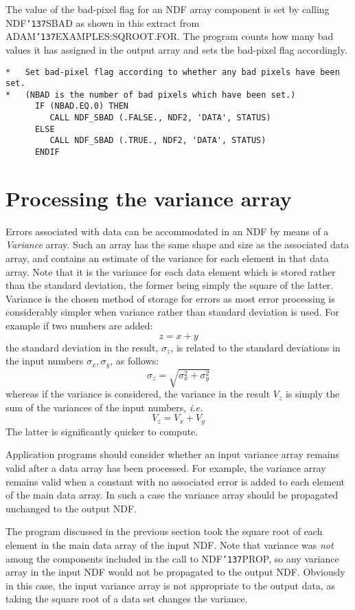 \documentclass[twoside,11pt]{article}
\renewcommand{\_}{{\tt\char'137}}
\newcommand{\xlabel}[1]{}
\begin{document}
The value of the bad-pixel flag for an NDF array component 
is set by calling NDF\_SBAD as shown in this extract 
from ADAM\_EXAMPLES:SQROOT.FOR.  The program  counts how many bad values 
it has assigned in the output array and sets the bad-pixel flag accordingly.
\begin{verbatim}
*   Set bad-pixel flag according to whether any bad pixels have been set.
*   (NBAD is the number of bad pixels which have been set.)
      IF (NBAD.EQ.0) THEN
         CALL NDF_SBAD (.FALSE., NDF2, 'DATA', STATUS)
      ELSE
         CALL NDF_SBAD (.TRUE., NDF2, 'DATA', STATUS)
      ENDIF
\end{verbatim}

\newpage
\section{Processing the variance array\label{variance}\xlabel{processing_the_variance_array}}

Errors associated with data can be accommodated in an NDF by means of a
{\sl Variance\/} array.
Such an array has the same shape and size
as the associated data array, and contains an estimate of the variance 
for each element in that data array.
Note that it is the variance for each data element which is stored 
rather than the standard deviation, the former being simply the square
of the latter.
Variance is the chosen method of storage for errors as
most error processing is 
considerably simpler when  variance rather than standard deviation is used.
For example if two numbers are added:
$$z=x+y$$
the standard deviation in the result, $\sigma_z$, is related to the standard
deviations in the input numbers $\sigma_x,\sigma_y$, as follows:
$$\sigma_z=\sqrt{\sigma_x^2+\sigma_y^2}$$
whereas if the variance is considered, the variance in the result
$V_z$ is simply the sum of the variances of the input numbers, {\it i.e.}
$$V_z=V_x+V_y$$
The latter is significantly quicker to compute.


Application programs should consider whether an input variance array
remains valid after a data array has been processed.
For example, the variance array remains valid when a 
constant with no 
associated error is added to each element of the main data array.
In such a case the 
variance array should be propagated unchanged to the output NDF.

The program discussed in the previous section took the square root of each 
element in the main data array of the input NDF.
Note that variance was {\sl not\/} among the components included in the 
call to NDF\_PROP, so any variance array in the input NDF would not
be propagated to the output NDF.
Obviously in this case, the input variance array is not appropriate to the
output data, as taking the square root of a data set 
changes the variance.
\end{document}
